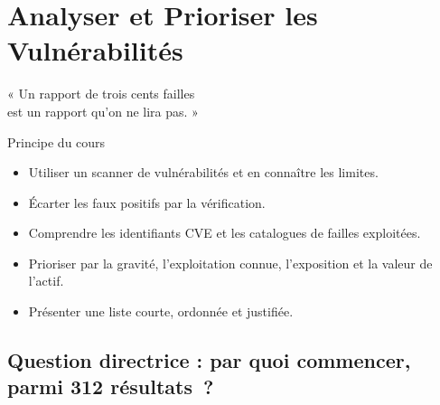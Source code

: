 
\chapter{Analyser et Prioriser les Vulnérabilités}
\label{chap:vulnerabilites}

\epigraph{%
    « Un rapport de trois cents failles\\
    est un rapport qu'on ne lira pas. »%
}{Principe du cours}


\begin{boxobjectifs}
\begin{itemize}
    \item Utiliser un scanner de vulnérabilités et en connaître les limites.
    \item Écarter les faux positifs par la vérification.
    \item Comprendre les identifiants CVE et les catalogues de failles
          exploitées.
    \item Prioriser par la gravité, l'exploitation connue, l'exposition et
          la valeur de l'actif.
    \item Présenter une liste courte, ordonnée et justifiée.
\end{itemize}
\end{boxobjectifs}

\bigskip

\section*{Question directrice : par quoi commencer, parmi 312 résultats~?}

